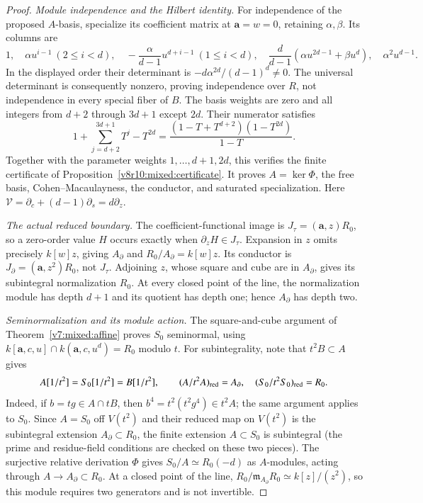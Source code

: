 \documentclass[10pt,fleqn]{article}
\numberwithin{equation}{section}
\begin{document}
\begin{proof}
\textit{Module independence and the Hilbert identity.}
For independence of the proposed $A$-basis, specialize its coefficient
matrix at $\mathbf a=w=0$, retaining $\alpha,\beta$.  Its columns are
\[
 1,\quad \alpha u^{i-1}\ (2\le i<d),\quad
 -\frac{\alpha}{d-1}u^{d+i-1}\ (1\le i<d),\quad
 \frac d{d-1}(\alpha u^{2d-1}+\beta u^d),\quad
 \alpha^2u^{d-1}.
\]
In the displayed order their determinant is
$-d\alpha^{2d}/(d-1)^d\ne0$.  The universal determinant is consequently
nonzero, proving independence over $R$, not independence in every
special fiber of $B$.
The basis weights are zero and all integers from $d+2$ through $3d+1$
except $2d$.  Their numerator satisfies
\[
 1+\sum_{j=d+2}^{3d+1}T^j-T^{2d}
       =\frac{(1-T+T^{d+2})(1-T^{2d})}{1-T}.
\]
Together with the parameter weights $1,\ldots,d+1,2d$, this verifies
the finite certificate of Proposition~\ref{v8r10:mixed:certificate}.
It proves $A=\ker\Phi$, the free basis, Cohen--Macaulayness, the conductor,
and saturated specialization.  Here
$\mathcal V=\partial_c+(d-1)\partial_s=d\partial_z$.

\textit{The actual reduced boundary.}\label{r23:mixed:boundary-algebra}
The coefficient-functional image is $J_\tau=(\mathbf a,z)R_0$, so a zero-order value $H$
occurs exactly when $\partial_zH\in J_\tau$.  Expansion in $z$ omits
precisely $k[w]z$, giving $A_\partial$ and $R_0/A_\partial=k[w]z$.
Its conductor is $J_\partial=(\mathbf a,z^2)R_0$, not $J_\tau$.
Adjoining $z$, whose square and cube are in $A_\partial$, gives its
subintegral normalization $R_0$.  At every closed point of the line,
the normalization module has depth $d+1$ and its quotient has depth one;
hence $A_\partial$ has depth two.

\textit{Seminormalization and its module action.}
The square-and-cube argument of Theorem~\ref{v7:mixed:affine} proves
$S_0$ seminormal, using
$k[\mathbf a,c,u]\cap k(\mathbf a,c,u^d)=R_0$ modulo $t$.
For subintegrality, note that $t^2B\subset A$ gives
\[
 A[1/t^2]=S_0[1/t^2]=B[1/t^2],\qquad
 (A/t^2A)_{\rm red}=A_\partial,\quad
 (S_0/t^2S_0)_{\rm red}=R_0.
\]
Indeed, if $b=tg\in A\cap tB$, then
$b^4=t^2(t^2g^4)\in t^2A$; the same argument applies
to $S_0$.  Since $A=S_0$ off $V(t^2)$ and their reduced map on $V(t^2)$ is the
subintegral extension $A_\partial\subset R_0$, the finite extension
$A\subset S_0$ is subintegral (the prime and residue-field conditions are
checked on these two pieces).  The surjective relative derivation $\Phi$ gives
$S_0/A\simeq R_0(-d)$ as $A$-modules, acting through
$A\to A_\partial\subset R_0$.
At a closed point of the line,
$R_0/\mathfrak m_{A_\partial}R_0\simeq k[z]/(z^2)$, so this module
requires two generators and is not invertible.


\end{proof}
\end{document}
